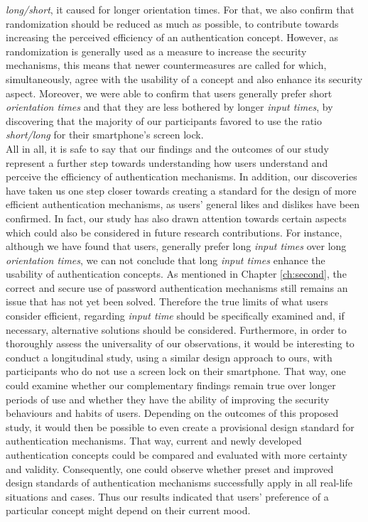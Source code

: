 \textit{long/short}, it caused for longer orientation times. For that, we also confirm that randomization should be reduced as much as possible, to contribute towards increasing the perceived efficiency of an authentication concept. However, as randomization is generally used as a measure to increase the security mechanisms, this means that newer countermeasures are called for which, simultaneously, agree with the usability of a concept and also enhance its security aspect. Moreover, we were able to confirm that users generally prefer short \textit{orientation times} and that they are less bothered by longer \textit{input times}, by discovering that the majority of our participants favored to use the ratio \textit{short/long} for their smartphone's screen lock.\\

All in all, it is safe to say that our findings and the outcomes of our study represent a further step towards understanding how users understand and perceive the efficiency of authentication mechanisms. In addition, our discoveries have taken us one step closer towards creating a standard for the design of more efficient authentication mechanisms, as users' general likes and dislikes have been confirmed. In fact, our study has also drawn attention towards certain aspects which could also be considered in future research contributions. For instance, although we have found that users, generally prefer long \textit{input times} over long \textit{orientation times}, we can not conclude that long \textit{input times} enhance the usability of authentication concepts. As mentioned in Chapter \ref{ch:second}, the correct and secure use of password authentication mechanisms still remains an issue that has not yet been solved. Therefore the true limits of what users consider efficient, regarding \textit{input time} should be specifically examined and, if necessary, alternative solutions should be considered. Furthermore, in order to thoroughly assess the universality of our observations, it would be interesting to conduct a longitudinal study, using a similar design approach to ours, with participants who do not use a screen lock on their smartphone. That way, one could examine whether our complementary findings remain true over longer periods of use and whether they have the ability of improving the security behaviours and habits of users. Depending on the outcomes of this proposed study, it would then be possible to even create a provisional design standard for authentication mechanisms. That way, current and newly developed authentication concepts could be compared and evaluated with more certainty and validity. Consequently, one could observe whether preset and improved design standards of authentication mechanisms successfully apply in all real-life situations and cases. Thus our results indicated that users' preference of a particular concept might depend on their current mood.



